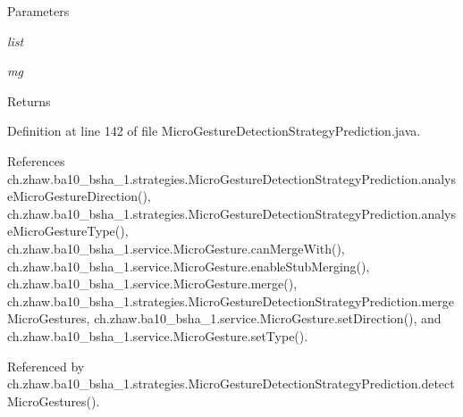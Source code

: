 \begin{DoxyParams}{Parameters}
\item[{\em list}]\item[{\em mg}]\end{DoxyParams}
\begin{DoxyReturn}{Returns}

\end{DoxyReturn}


Definition at line 142 of file MicroGestureDetectionStrategyPrediction.java.

References ch.zhaw.ba10\_\-bsha\_\-1.strategies.MicroGestureDetectionStrategyPrediction.analyseMicroGestureDirection(), ch.zhaw.ba10\_\-bsha\_\-1.strategies.MicroGestureDetectionStrategyPrediction.analyseMicroGestureType(), ch.zhaw.ba10\_\-bsha\_\-1.service.MicroGesture.canMergeWith(), ch.zhaw.ba10\_\-bsha\_\-1.service.MicroGesture.enableStubMerging(), ch.zhaw.ba10\_\-bsha\_\-1.service.MicroGesture.merge(), ch.zhaw.ba10\_\-bsha\_\-1.strategies.MicroGestureDetectionStrategyPrediction.mergeMicroGestures, ch.zhaw.ba10\_\-bsha\_\-1.service.MicroGesture.setDirection(), and ch.zhaw.ba10\_\-bsha\_\-1.service.MicroGesture.setType().

Referenced by ch.zhaw.ba10\_\-bsha\_\-1.strategies.MicroGestureDetectionStrategyPrediction.detectMicroGestures().

